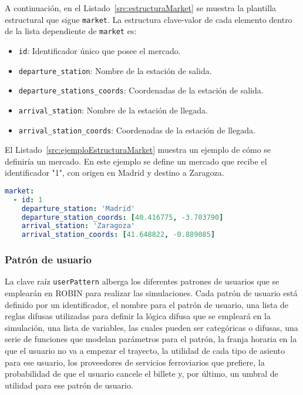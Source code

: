 A continuación, en el Listado~\ref{src:estructuraMarket} se muestra la plantilla estructural que sigue \texttt{market}. La estructura clave-valor de cada elemento dentro de la lista dependiente de \texttt{market} es:

\begin{itemize}
    \item \texttt{id}: Identificador único que posee el mercado.
    \item \texttt{departure\_station}: Nombre de la estación de salida.
    \item \texttt{departure\_stations\_coords}: Coordenadas de la estación de salida.
    \item \texttt{arrival\_station}: Nombre de la estación de llegada.
    \item \texttt{arrival\_station\_coords}: Coordenadas de la estación de llegada.
\end{itemize}

El Listado~\ref{src:ejemploEstructuraMarket} muestra un ejemplo de cómo se definiría un mercado. En este ejemplo se define un mercado que recibe el identificador "1", con origen en Madrid y destino a Zaragoza.

\begin{lstlisting}[language=YAML,
                   frame=none,
                   numbers=none,
                   basicstyle=\ttfamily\normalsize,
                   caption={Ejemplo con datos reales de la estructura de \texttt{market}},
                   label=src:ejemploEstructuraMarket,
                   inputencoding=utf8]
market:
  - id: 1
    departure_station: 'Madrid'
    departure_station_coords: [40.416775, -3.703790]
    arrival_station: 'Zaragoza'
    arrival_station_coords: [41.648822, -0.889085]
\end{lstlisting}

\subsubsection{Patrón de usuario}

La clave raíz \texttt{userPattern} alberga los diferentes patrones de usuarios que se emplearán en \acrshort{ROBIN} para realizar las simulaciones. Cada patrón de usuario está definido por un identificador, el nombre para el patrón de usuario, una lista de reglas difusas utilizadas para definir la lógica difusa que se empleará en la simulación, una lista de variables, las cuales pueden ser categóricas o difusas, una serie de funciones que modelan parámetros para el patrón, la franja horaria en la que el usuario no va a empezar el trayecto, la utilidad de cada tipo de asiento para ese usuario, los proveedores de servicios ferroviarios que prefiere, la probabilidad de que el usuario cancele el billete y, por último, un umbral de utilidad para ese patrón de usuario.

